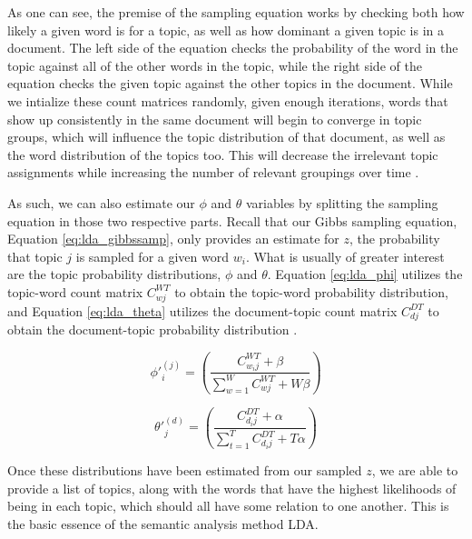 \documentclass[a4paper]{article}
\begin{document}
As one can see, the premise of the sampling equation works by checking both how likely a given word is for a topic, as well as how dominant a given topic is in a document. The left side of the equation checks the probability of the word in the topic against all of the other words in the topic, while the right side of the equation checks the given topic against the other topics in the document. While we intialize these count matrices randomly, given enough iterations, words that show up consistently in the same document will begin to converge in topic groups, which will influence the topic distribution of that document, as well as the word distribution of the topics too. This will decrease the irrelevant topic assignments while increasing the number of relevant groupings over time \cite{lda}.

As such, we can also estimate our $\phi$ and $\theta$ variables by splitting the sampling equation in those two respective parts. Recall that our Gibbs sampling equation, Equation \ref{eq:lda_gibbssamp}, only provides an estimate for $z$, the probability that topic $j$ is sampled for a given word $w_i$. What is usually of greater interest are the topic probability distributions, $\phi$ and $\theta$. Equation \ref{eq:lda_phi} utilizes the topic-word count matrix $C_{wj}^{WT}$ to obtain the topic-word probability distribution, and Equation \ref{eq:lda_theta} utilizes the document-topic count matrix $C_{dj}^{DT}$ to obtain the document-topic probability distribution \cite{lda}.

\begin{equation}\label{eq:lda_phi}
  \phi'^{(j)}_i = (\frac{C_{w_ij}^{WT} + \beta}
  {\sum\limits^W_{w = 1} C_{wj}^{WT} + W\beta})
\end{equation}

\begin{equation}\label{eq:lda_theta}
  \theta'^{(d)}_j = (\frac{C_{d_ij}^{DT} + \alpha}
  {\sum\limits^T_{t = 1} C_{d_ij}^{DT} + T\alpha})
\end{equation}

Once these distributions have been estimated from our sampled $z$, we are able to provide a list of topics, along with the words that have the highest likelihoods of being in each topic, which should all have some relation to one another. This is the basic essence of the semantic analysis method LDA.
\end{document}
